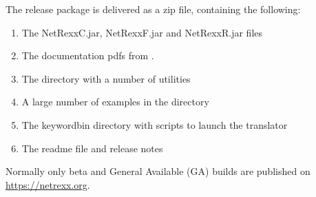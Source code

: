 The \nr{} release package is delivered as a zip file, containing the following:
\begin{enumerate}
    \item The NetRexxC.jar, NetRexxF.jar and NetRexxR.jar files
    \item The documentation pdfs from .
    \item The  directory with a number of utilities
    \item A large number of examples in the  directory
    \item The keyword{bin} directory with scripts to launch the translator
    \item The readme file and release notes
\end{enumerate}


Normally only beta and General Available (GA) builds are published on \url{https://netrexx.org}.




